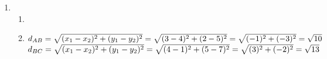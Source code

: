 \begin{eocsolutions}{}
{\begin{enumerate}[itemsep=5pt, label=\textbf{\arabic*}. ]
\begin{enumerate}[itemsep=5pt, label=\textbf{(\alph*)} ]
\item
$M_{GI} = (\dfrac{x_1+x_2}{2};\dfrac{y_1+y_2}{2})\\[4pt]
    = (\frac{1+7}{2};\frac{5+2}{2})\\
    = (\frac{8}{2};\frac{7}{2})\\
    = (4;\frac{7}{2})$\\

$M_{FH} = (\dfrac{x_1+x_2}{2};\dfrac{y_1+y_2}{2})\\[4pt]
    = (\frac{3+2}{2};\frac{7+0}{2})\\
    = (\frac{5}{2};\frac{7}{2})$\\
Therefore $M_{GI}\ne M_{FH}$ and diagonals do not bisect each other.\\

\item This is an ordinary quadrilateral.
\end{enumerate}

\item  %
    \begin{enumerate}[itemsep=5pt, label=\textbf{(\alph*)} ] 
\item %
\item
$d_{AB} = \sqrt{(x_1-x_2)^2+(y_1-y_2)^2}\\
    = \sqrt{(3-4)^2+(2-5)^2}\\
    = \sqrt{(-1)^2+(-3)^2}\\
    = \sqrt{10}$\\

$d_{BC} = \sqrt{(x_1-x_2)^2+(y_1-y_2)^2}\\
    = \sqrt{(4-1)^2+(5-7)^2}\\
    = \sqrt{(3)^2+(-2)^2}\\
    = \sqrt{13}$\\


\end{enumerate}
\end{enumerate}}
\end{eocsolutions}
